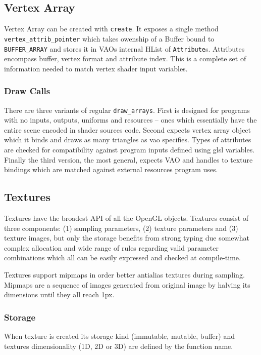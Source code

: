 \subsection{Vertex Array}

Vertex Array can be created with \texttt{create}. It exposes a single method \texttt{vertex\_attrib\_pointer} which takes owenship of a Buffer bound to \texttt{BUFFER\_ARRAY}
and stores it in VAOs internal HList of \texttt{Attribute}s.
Attributes encompass buffer, vertex format and attribute index. This is a complete set of information needed to match vertex shader input variables.

\subsubsection{Draw Calls}

There are three variants of regular \texttt{draw\_arrays}. First is designed for programs with no inputs, outputs, uniforms and resources -- ones which essentially have the entire scene
encoded in shader sources code. 
Second expects vertex array object which it binds and draws as many triangles as vao specifies. Types of attributes are checked for compatibility against program inputs defined using glsl variables.
Finally the third version, the most general, expects VAO and handles to texture bindings which are matched against external resources program uses. 

\subsection{Textures}

Textures have the broadest API of all the OpenGL objects.
Textures consist of three components: (1) sampling parameters, (2) texture parameters and (3) texture images, but only the storage benefits 
from strong typing due somewhat complex allocation and wide range of rules regarding valid parameter combinations which all can be easily expressed and checked at compile-time.

Textures support mipmaps in order better antialias textures during sampling. Mipmaps are a sequence of images generated from original image by halving its dimensions until they all reach 1px.

\subsubsection{Storage}

When texture is created its storage kind (immutable, mutable, buffer) and textures dimensionality (1D, 2D or 3D) are defined by the function name.

